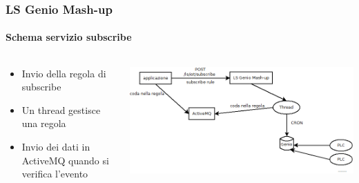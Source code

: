 \documentclass{beamer}
\begin{document}
\begin{frame}
\frametitle{LS Genio Mash-up}
\framesubtitle{Schema servizio subscribe}
\begin{columns}[T] %
	\begin{column}{.38\textwidth}
		\begin{itemize}
			\small
			\item Invio della regola di subscribe
			\item Un thread gestisce una regola
			\item Invio dei dati in ActiveMQ quando si verifica l'evento
			
		\end{itemize}
		
	\end{column}%
	\hfill%
	\begin{column}{.60\textwidth}
		\includegraphics[width=1\textwidth]{images/schema-subscribe.png}
	\end{column}%
\end{columns}
\end{frame}
\end{document}
